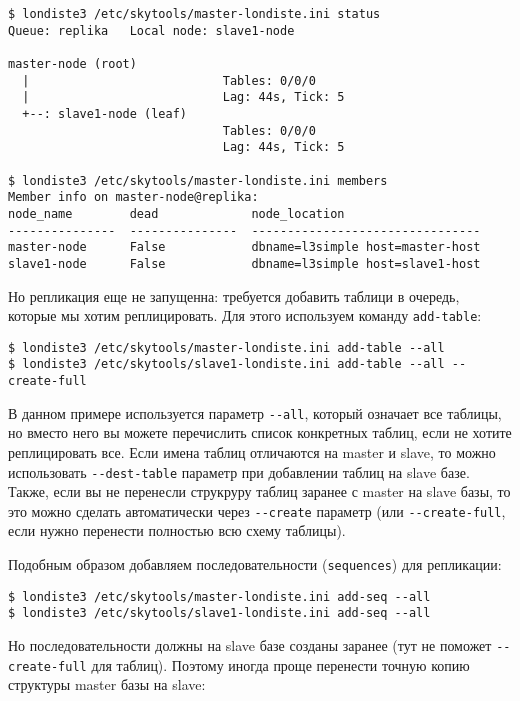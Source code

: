 \begin{lstlisting}[label=lst:londiste-replica13,caption=Статус кластера]
$ londiste3 /etc/skytools/master-londiste.ini status
Queue: replika   Local node: slave1-node

master-node (root)
  |                           Tables: 0/0/0
  |                           Lag: 44s, Tick: 5
  +--: slave1-node (leaf)
                              Tables: 0/0/0
                              Lag: 44s, Tick: 5

$ londiste3 /etc/skytools/master-londiste.ini members
Member info on master-node@replika:
node_name        dead             node_location
---------------  ---------------  --------------------------------
master-node      False            dbname=l3simple host=master-host
slave1-node      False            dbname=l3simple host=slave1-host
\end{lstlisting}

Но репликация еще не запущенна: требуется добавить таблици в очередь, которые мы хотим реплицировать. Для этого используем команду \lstinline!add-table!:

\begin{lstlisting}[label=lst:londiste-replica13,caption=Добавляем таблицы]
$ londiste3 /etc/skytools/master-londiste.ini add-table --all
$ londiste3 /etc/skytools/slave1-londiste.ini add-table --all --create-full
\end{lstlisting}

В данном примере используется параметр \lstinline!--all!, который означает все таблицы, но вместо него вы можете перечислить список конкретных таблиц, если не хотите реплицировать все. Если имена таблиц отличаются на master и slave, то можно использовать \lstinline!--dest-table! параметр при добавлении таблиц на slave базе. Также, если вы не перенесли струкруру таблиц заранее с master на slave базы, то это можно сделать автоматически через \lstinline!--create! параметр (или \lstinline!--create-full!, если нужно перенести полностью всю схему таблицы).

Подобным образом добавляем последовательности (\lstinline!sequences!) для репликации:

\begin{lstlisting}[label=lst:londiste-replica14,caption=Добавляем последовательности]
$ londiste3 /etc/skytools/master-londiste.ini add-seq --all
$ londiste3 /etc/skytools/slave1-londiste.ini add-seq --all
\end{lstlisting}

Но последовательности должны на slave базе созданы заранее (тут не поможет \lstinline!--create-full! для таблиц). Поэтому иногда проще перенести точную копию структуры master базы на slave:

